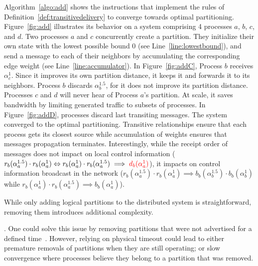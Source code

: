 Algorithm~\ref{algo:add} shows the instructions that implement the
rules of Definition~\ref{def:transitivedelivery} to converge towards
optimal partitioning. Figure~\ref{fig:add} illustrates its behavior on
a system comprising 4 processes $a$, $b$, $c$, and $d$. Two processes
$a$ and $c$ concurrently create a partition. They initialize their own
state with the lowest possible bound $0$ (see
Line~\ref{line:lowestbound}), and send a message to each of their
neighbors by accumulating the corresponding edge weight (see
Line~\ref{line:accumulator}). In Figure~\ref{fig:addC}, Process $b$
receives $\alpha_{c}^{1}$. Since it improves its own partition
distance, it keeps it and forwards it to its neighbors. Process $b$
discards $\alpha_{b}^{1.5}$, for it does not improve its partition
distance. Processes $c$ and $d$ will never hear of Process $a$'s
partition. At scale, it saves bandwidth by limiting generated traffic
to subsets of processes. In Figure~\ref{fig:addD}, processes discard
last transiting messages. The system converged to the optimal
partitioning.  Transitive relationships ensure that each process gets
its closest source while accumulation of weights ensures that messages
propagation terminates.  Interestingly, while the receipt order of
messages does not impact on local control information
($r_b(\alpha_a^{1.5}) \cdot r_b(\alpha_a^{1}) \Leftrightarrow
r_b(\alpha_a^{1}) \cdot r_b(\alpha_a^{1.5}) \implies
\textcolor{red}{d_b(\alpha_a^{1})}$), it impacts on control information
broadcast in the network ($r_b(\alpha_a^{1.5}) \cdot r_b(\alpha_a^{1})
\implies b_b(\alpha_{b}^{1.5}) \cdot b_b(\alpha_{b}^{1})$ while
$r_b(\alpha_a^{1}) \cdot r_b(\alpha_a^{1.5}) \implies
b_b(\alpha_a^{1})$).

While only adding logical partitions to the distributed system is
straightforward, removing them introduces additional complexity. 


\begin{definition}
\end{definition}
  
 . One could solve this issue by
removing partitions that were not advertised for a defined
time~\REF. However, relying on physical timeout could lead to either
premature removals of partitions when they are still operating; or
slow convergence where processes believe they belong to a partition
that was removed.


